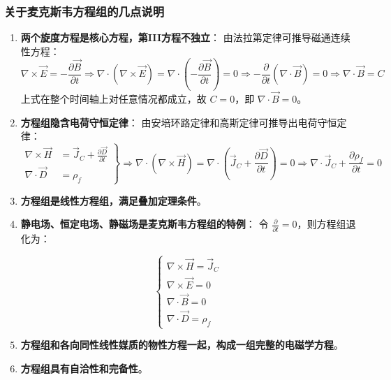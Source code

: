 \subsubsection{关于麦克斯韦方程组的几点说明}
\begin{enumerate}
    \item \textbf{两个旋度方程是核心方程，第III方程不独立}：
    由法拉第定律可推导磁通连续性方程：
    \[
    \nabla \times \vec{E} = -\frac{\partial \vec{B}}{\partial t}
    \Rightarrow \nabla \cdot (\nabla \times \vec{E}) = \nabla \cdot \left(-\frac{\partial \vec{B}}{\partial t}\right) = 0
    \Rightarrow -\frac{\partial}{\partial t} (\nabla \cdot \vec{B}) = 0
    \Rightarrow \nabla \cdot \vec{B} = C
    \]
    上式在整个时间轴上对任意情况都成立，故 $C=0$，即 $\nabla \cdot \vec{B} = 0$。

    \item \textbf{方程组隐含电荷守恒定律}：
    由安培环路定律和高斯定律可推导出电荷守恒定律：
    \[
    \left.
    \begin{aligned}
    \nabla \times \vec{H} &= \vec{J}_C + \frac{\partial \vec{D}}{\partial t} \\
    \nabla \cdot \vec{D} &= \rho_f
    \end{aligned}
    \right\}
    \Rightarrow \nabla \cdot (\nabla \times \vec{H}) = \nabla \cdot \left( \vec{J}_C + \frac{\partial \vec{D}}{\partial t} \right) = 0
    \Rightarrow \nabla \cdot \vec{J}_C + \frac{\partial \rho_f}{\partial t} = 0
    \]

    \item \textbf{方程组是线性方程组，满足叠加定理条件}。

    \item \textbf{静电场、恒定电场、静磁场是麦克斯韦方程组的特例}：
    令 $\frac{\partial}{\partial t} = 0$，则方程组退化为：
    \begin{formulaBox}
    \[
    \begin{cases}
    \nabla \times \vec{H} = \vec{J}_C \\
    \nabla \times \vec{E} = 0 \\
    \nabla \cdot \vec{B} = 0 \\
    \nabla \cdot \vec{D} = \rho_f
    \end{cases}
    \]
    \end{formulaBox}

    \item \textbf{方程组和各向同性线性媒质的物性方程一起，构成一组完整的电磁学方程}。

    \item \textbf{方程组具有自洽性和完备性}。


\end{enumerate}
